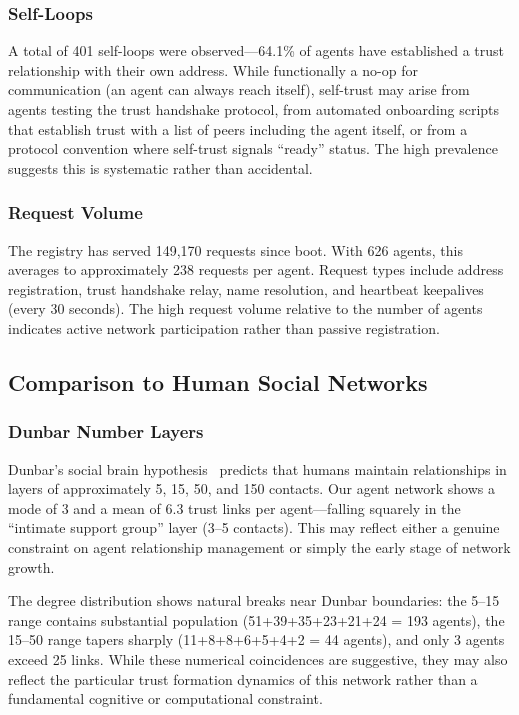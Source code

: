 \documentclass[11pt,twocolumn]{article}
\begin{document}
\subsubsection{Self-Loops}

A total of 401 self-loops were observed---64.1\% of agents have established a trust relationship with their own address. While functionally a no-op for communication (an agent can always reach itself), self-trust may arise from agents testing the trust handshake protocol, from automated onboarding scripts that establish trust with a list of peers including the agent itself, or from a protocol convention where self-trust signals ``ready'' status. The high prevalence suggests this is systematic rather than accidental.

\subsubsection{Request Volume}

The registry has served 149,170 requests since boot. With 626 agents, this averages to approximately 238 requests per agent. Request types include address registration, trust handshake relay, name resolution, and heartbeat keepalives (every 30 seconds). The high request volume relative to the number of agents indicates active network participation rather than passive registration.

\subsection{Comparison to Human Social Networks}
\label{sec:comparison}

\subsubsection{Dunbar Number Layers}

Dunbar's social brain hypothesis~\citep{dunbar1992neocortex} predicts that humans maintain relationships in layers of approximately 5, 15, 50, and 150 contacts. Our agent network shows a mode of 3 and a mean of 6.3 trust links per agent---falling squarely in the ``intimate support group'' layer (3--5 contacts). This may reflect either a genuine constraint on agent relationship management or simply the early stage of network growth.

The degree distribution shows natural breaks near Dunbar boundaries: the 5--15 range contains substantial population (51+39+35+23+21+24 = 193 agents), the 15--50 range tapers sharply (11+8+8+6+5+4+2 = 44 agents), and only 3 agents exceed 25 links. While these numerical coincidences are suggestive, they may also reflect the particular trust formation dynamics of this network rather than a fundamental cognitive or computational constraint.
\end{document}
